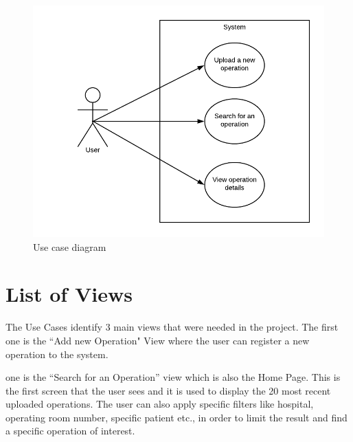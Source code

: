 \begin{figure}[h]
\begin{center}
\includegraphics[width=17cm]{imgs/Use_Case_Diagram.png}
\end{center}\vspace{-0.3cm}
\caption[Use Case Diagram]{Use case diagram} \label{UC-diagram}
\end{figure}

\section{List of Views}
\label{sub:List_Of_Views}

The Use Cases identify 3 main views that were needed in the project. The first one is the ``Add new Operation" View where the user can register a new operation to the system. 


one is the ``Search for an Operation'' view which is also the Home Page. This is the first screen that the user sees and it is used to display the 20 most recent uploaded operations. The user can also apply specific filters like hospital, operating room number, specific patient etc., in order to limit the result and find a specific operation of interest. 




